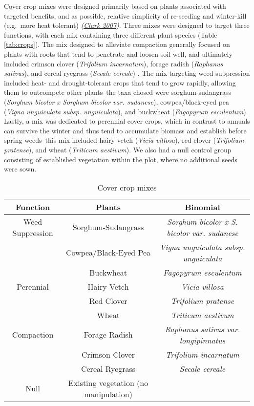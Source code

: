\documentclass[
]{article}
\begin{document}
Cover crop mixes were designed primarily based on plants associated with targeted benefits, and as possible, relative simplicity of re-seeding and winter-kill (e.g.~more heat tolerant) \emph{(\protect\hyperlink{ref-clark07}{Clark 2007})}.
Three mixes were designed to target three functions, with each mix containing three different plant species (Table \ref{tab:crops}).
The mix designed to alleviate compaction generally focused on plants with roots that tend to penetrate and loosen soil well, and ultimately included
crimson clover (\emph{Trifolium incarnatum}),
forage radish (\emph{Raphanus sativus}), and
cereal ryegrass (\emph{Secale cereale})
.
The mix targeting weed suppression included heat- and drought-tolerant crops that tend to grow rapidly, allowing them to outcompete other plants--the taxa chosed were
sorghum-sudangrass (\emph{Sorghum bicolor x Sorghum bicolor var. sudanese}),
cowpea/black-eyed pea (\emph{Vigna unguiculata subsp. unguiculata}), and
buckwheat (\emph{Fagopyrum esculentum}).
Lastly, a mix was dedicated to perennial cover crops, which in contrast to annuals can survive the winter and thus tend to accumulate biomass and establish before spring weeds--this mix included
hairy vetch (\emph{Vicia villosa}),
red clover (\emph{Trifolium pratense}), and
wheat (\emph{Triticum aestivum}).
We also had a null control group consisting of established vegetation within the plot, where no additional seeds were sown.

\begin{table}

\caption{\label{tab:setupM}Cover crop mixes}
\centering
\begin{tabular}[t]{c|c|>{}c}
\hline
\textbf{Function} & \textbf{Plants} & \textbf{Binomial}\\
\hline
Weed Suppression & Sorghum-Sudangrass & \em{Sorghum bicolor x S. bicolor var. sudanese}\\
\hline
 & Cowpea/Black-Eyed Pea & \em{Vigna unguiculata subsp. unguiculata}\\
\hline
 & Buckwheat & \em{Fagopyrum esculentum}\\
\hline
Perennial & Hairy Vetch & \em{Vicia villosa}\\
\hline
 & Red Clover & \em{Trifolium pratense}\\
\hline
 & Wheat & \em{Triticum aestivum}\\
\hline
Compaction & Forage Radish & \em{Raphanus sativus var. longipinnatus}\\
\hline
 & Crimson Clover & \em{Trifolium incarnatum}\\
\hline
 & Cereal Ryegrass & \em{Secale cereale}\\
\hline
Null & Existing vegetation (no manipulation) & \em{}\\
\hline
\end{tabular}
\end{table}
\end{document}
